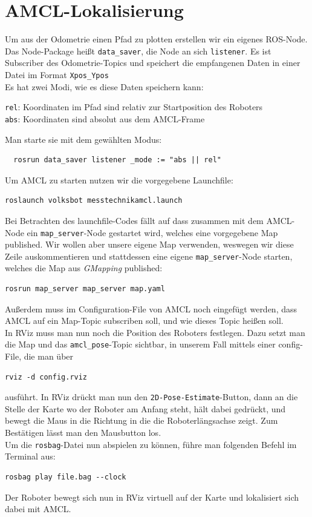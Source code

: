 \documentclass[11pt,a4paper]{article}
\begin{document}
\section{AMCL-Lokalisierung}
Um aus der Odometrie einen Pfad zu plotten erstellen wir ein eigenes ROS-Node. Das Node-Package heißt \verb|data_saver|, 
die Node an sich \texttt{listener}. Es ist Subscriber des Odometrie-Topics und speichert die empfangenen Daten 
in einer Datei im Format \verb|Xpos_Ypos| \\
Es hat zwei Modi, wie es diese Daten speichern kann:
\begin{center}
\texttt{rel}: Koordinaten im Pfad sind relativ zur Startposition des Roboters \\
\texttt{abs}: Koordinaten sind absolut aus dem AMCL-Frame \\
\end{center}
Man starte sie mit dem gewählten Modus:
\begin{verbatim}
  rosrun data_saver listener _mode := "abs || rel"
\end{verbatim}
Um AMCL zu starten nutzen wir die vorgegebene Launchfile:
\begin{verbatim}
roslaunch volksbot messtechnikamcl.launch
\end{verbatim}
Bei Betrachten des launchfile-Codes fällt auf dass zusammen mit dem AMCL-Node ein \verb|map_server|-Node gestartet
wird, welches eine vorgegebene Map published. Wir wollen aber unsere eigene Map verwenden, weswegen wir diese Zeile
auskommentieren und stattdessen eine eigene \verb|map_server|-Node starten, welches die Map aus \textit{GMapping}
published: \begin{verbatim}
rosrun map_server map_server map.yaml
\end{verbatim}
Außerdem muss im Configuration-File von AMCL noch eingefügt werden, dass AMCL auf ein Map-Topic subscriben soll,
und wie dieses Topic heißen soll. \\
In RViz muss man nun noch die Position des Roboters festlegen. Dazu setzt man die Map und das \verb|amcl_pose|-Topic
sichtbar, in unserem Fall mittels einer config-File, die man über \begin{verbatim}
rviz -d config.rviz
\end{verbatim}
ausführt.
In RViz drückt man nun den \verb|2D-Pose-Estimate|-Button, dann an die Stelle der Karte wo der Roboter am Anfang steht,
hält dabei gedrückt, und bewegt die Maus in die Richtung in die die Roboterlängsachse zeigt. Zum Bestätigen
lässt man den Mausbutton los. \\
Um die \texttt{rosbag}-Datei nun abspielen zu können, führe man folgenden Befehl im Terminal aus:
\begin{verbatim}
rosbag play file.bag --clock
\end{verbatim}
Der Roboter bewegt sich nun in RViz virtuell auf der Karte und lokalisiert sich dabei mit AMCL.
\end{document}
